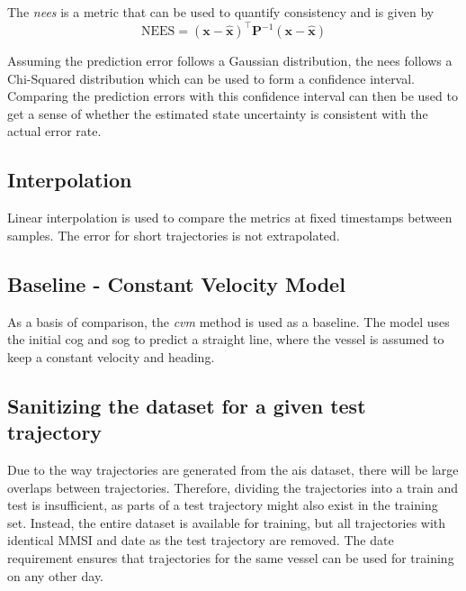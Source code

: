 The \textit{\acrfull{nees}} is a metric that can be used to quantify consistency and is given by
\begin{equation}
    \text{NEES} = (\boldsymbol{x} - \hat{\boldsymbol{x}})^\intercal \boldsymbol{P}^{-1} (\boldsymbol{x} - \hat{\boldsymbol{x}})
\end{equation}

Assuming the prediction error follows a Gaussian distribution, the \acrshort{nees} follows a Chi-Squared distribution which can be used to form a confidence interval. Comparing the prediction errors with this confidence interval can then be used to get a sense of whether the estimated state uncertainty is consistent with the actual error rate.

\subsection{Interpolation}
Linear interpolation is used to compare the metrics at fixed timestamps between samples. The error for short trajectories is not extrapolated.

\subsection{Baseline - Constant Velocity Model}
As a basis of comparison, the \textit{\acrfull{cvm}} method is used as a baseline. The model uses the initial \acrshort{cog} and \acrshort{sog} to predict a straight line, where the vessel is assumed to keep a constant velocity and heading.

\subsection{Sanitizing the dataset for a given test trajectory}
Due to the way trajectories are generated from the \acrshort{ais} dataset, there will be large overlaps between trajectories. Therefore, dividing the trajectories into a train and test is insufficient, as parts of a test trajectory might also exist in the training set. Instead, the entire dataset is available for training, but all trajectories with identical MMSI and date as the test trajectory are removed. The date requirement ensures that trajectories for the same vessel can be used for training on any other day.

